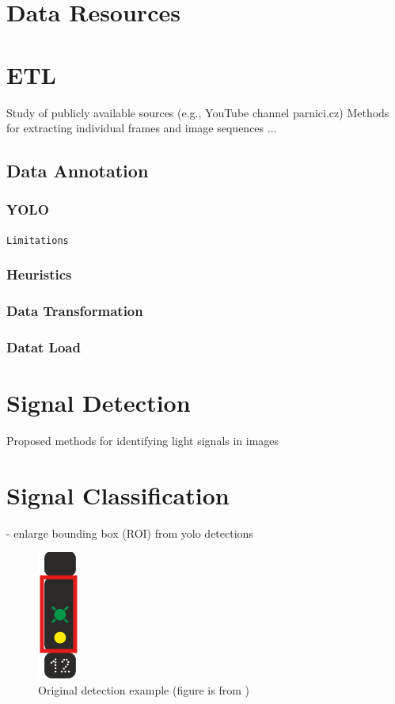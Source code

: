 \documentclass[english, ing, kiv, he, iso690alph, pdf, viewonly]{fasthesis}
\begin{document}
\section{Data Resources}

\newpage
\section{ETL}


Study of publicly available sources (e.g., YouTube channel parnici.cz)
Methods for extracting individual frames and image sequences ... \cite{lin2015microsoft}

\subsection{Data Annotation}
\subsubsection{YOLO}

\texttt{Limitations}


\subsubsection{Heuristics}


\subsubsection{Data Transformation}


\subsubsection{Datat Load}


\newpage
\section{Signal Detection}

Proposed methods for identifying light signals in images




\section{Signal Classification}
- enlarge bounding box (ROI) from yolo detections

\begin{figure}[!ht]
    \centering
    \includegraphics[width=0.07\linewidth]{myimgs/example_roi.png}
    \caption{Original detection example (figure is from \cite{sprava_zeleznic_predpis})}
    \label{fig:original detection example}
\end{figure}
\end{document}

